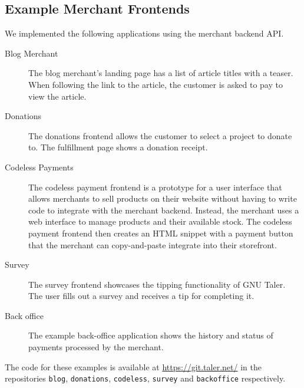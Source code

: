 
\subsection{Example Merchant Frontends}
We implemented the following applications using the merchant backend API.

\begin{description}
  \item[Blog Merchant] The blog merchant's landing page has a list of article titles with a teaser.
    When following the link to the article, the customer is asked to pay to view the article.
  \item[Donations]  The donations frontend allows the customer to select a project to donate to.
    The fulfillment page shows a donation receipt.
  \item[Codeless Payments]  The codeless payment frontend is a prototype for a
    user interface that allows merchants to sell products on their website
    without having to write code to integrate with the merchant backend.
    Instead, the merchant uses a web interface to manage products and their
    available stock.  The codeless payment frontend then creates an HTML snippet with a payment
    button that the merchant can copy-and-paste integrate into their storefront.
  \item[Survey]  The survey frontend showcases the tipping functionality of GNU Taler.
    The user fills out a survey and receives a tip for completing it.
  \item[Back office] The example back-office application shows the history and
    status of payments processed by the merchant.
\end{description}

The code for these examples is available at \url{https://git.taler.net/} in the
repositories \texttt{blog}, \texttt{donations}, \texttt{codeless}, \texttt{survey}
and \texttt{backoffice} respectively.

